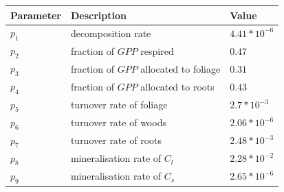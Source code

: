 \documentclass[11pt]{article}
\begin{document}
\begin{center}
\begin{tabular}{| l | l | l |}
\hline
Parameter & Description & Value \\ \hline
$p_1 $ & decomposition rate & $4.41*10^{-6}$ \\ \hline
$p_2 $ & fraction of $GPP$ respired & $0.47$ \\ \hline
$p_3 $ & fraction of $GPP$ allocated to foliage & $0.31$ \\ \hline
$p_4 $ & fraction of $GPP$ allocated to roots & $0.43$ \\ \hline
$p_5 $ & turnover rate of foliage & $2.7*10^{-3}$ \\ \hline
$p_6 $ & turnover rate of woods & $2.06*10^{-6}$ \\ \hline
$p_7 $ & turnover rate of roots & $2.48*10^{-3}$ \\ \hline
$p_8 $ & mineralisation rate of $C_l$ & $2.28*10^{-2}$ \\ \hline
$p_9 $ & mineralisation rate of $C_s$ & $2.65*10^{-6}$ \\ 
\hline
\end{tabular}    
\end{center}
\end{document}
